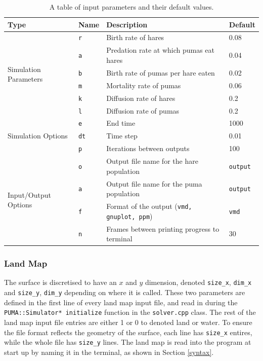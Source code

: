 \documentclass[a4paper,11pt]{article}
\begin{document}
{\begin{table}
\centering
\begin{tabular}{|l|l|l|l|}
\hline
\textbf{Type} & \textbf{Name} & \textbf{Description} & \textbf{Default} \\ \hline
\multirow{6}{*}{Simulation Parameters} 
 & \texttt{r} & Birth rate of hares & 0.08 \\
 & \texttt{a} & Predation rate at which pumas eat hares & 0.04\\
 & \texttt{b} & Birth rate of pumas per hare eaten & 0.02 \\
 & \texttt{m} & Mortality rate of pumas & 0.06 \\ 
 & \texttt{k} & Diffusion rate of hares  & 0.2 \\ 
 & \texttt{l} & Diffusion rate of pumas & 0.2 \\ \hline
\multirow{3}{*}{Simulation Options} 
 & \texttt{e} & End time & 1000 \\
 & \texttt{dt} & Time step & 0.01\\
 & \texttt{p} & Iterations between outputs & 100\\ \hline
\multirow{4}{*}{Input/Output Options} 
 & \texttt{o} & Output file name for the hare population & \texttt{output} \\
 & \texttt{a} & Output file name for the puma population & \texttt{output} \\
 & \texttt{f}  &  Format of the output (\texttt{vmd, gnuplot, ppm}) & \texttt{vmd} \\
 & \texttt{n} & Frames between printing progress to terminal & 30 \\
\hline
\end{tabular}
\caption{A table of input parameters and their default values.}
\label{tb:parameters}
\end{table}


\subsubsection{Land Map}

The surface is discretised to have an $x$ and $y$ dimension, denoted \texttt{size\_x}, \texttt{dim\_x} and \texttt{size\_y}, \texttt{dim\_y} depending on where it is called.  These two parameters are defined in the first line of every land map input file, and read in during the \texttt{ PUMA::Simulator* initialize} function in the \texttt{solver.cpp} class.  The rest of the land map input file entries are either 1 or 0 to denoted land or water.  To ensure the file format reflects the geometry of the surface, each line has \texttt{size\_x} entires, while the whole file has \texttt{size\_y} lines. The land map is read into the program at start up by naming it in the terminal, as shown in Section \ref{syntax}.

}
\end{document}
